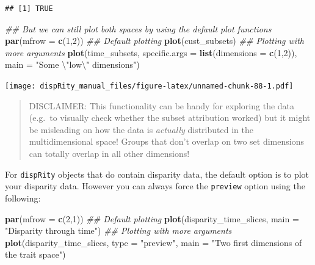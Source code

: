\documentclass[
]{book}
\newenvironment{Shaded}{\begin{snugshade}}{\end{snugshade}}
\newcommand{\CharTok}[1]{\textcolor[rgb]{0.31,0.60,0.02}{#1}}
\newcommand{\CommentTok}[1]{\textcolor[rgb]{0.56,0.35,0.01}{\textit{#1}}}
\newcommand{\DataTypeTok}[1]{\textcolor[rgb]{0.13,0.29,0.53}{#1}}
\newcommand{\DecValTok}[1]{\textcolor[rgb]{0.00,0.00,0.81}{#1}}
\newcommand{\KeywordTok}[1]{\textcolor[rgb]{0.13,0.29,0.53}{\textbf{#1}}}
\newcommand{\NormalTok}[1]{#1}
\newcommand{\StringTok}[1]{\textcolor[rgb]{0.31,0.60,0.02}{#1}}
\begin{document}
\begin{verbatim}
## [1] TRUE
\end{verbatim}

\begin{Shaded}
\begin{Highlighting}[]
\CommentTok{\#\# But we can still plot both spaces by using the default plot functions}
\KeywordTok{par}\NormalTok{(}\DataTypeTok{mfrow =} \KeywordTok{c}\NormalTok{(}\DecValTok{1}\NormalTok{,}\DecValTok{2}\NormalTok{))}
\CommentTok{\#\# Default plotting}
\KeywordTok{plot}\NormalTok{(cust\_subsets)}
\CommentTok{\#\# Plotting with more arguments}
\KeywordTok{plot}\NormalTok{(time\_subsets, }\DataTypeTok{specific.args =} \KeywordTok{list}\NormalTok{(}\DataTypeTok{dimensions =} \KeywordTok{c}\NormalTok{(}\DecValTok{1}\NormalTok{,}\DecValTok{2}\NormalTok{)),}
     \DataTypeTok{main =} \StringTok{"Some }\CharTok{\textbackslash{}"}\StringTok{low}\CharTok{\textbackslash{}"}\StringTok{ dimensions"}\NormalTok{)}
\end{Highlighting}
\end{Shaded}

\texttt{[image: dispRity\_manual\_files/figure-latex/unnamed-chunk-88-1.pdf]}

\begin{quote}
DISCLAIMER: This functionality can be handy for exploring the data (e.g.~to visually check whether the subset attribution worked) but it might be misleading on how the data is \emph{actually} distributed in the multidimensional space!
Groups that don't overlap on two set dimensions can totally overlap in all other dimensions!
\end{quote}

For \texttt{dispRity} objects that do contain disparity data, the default option is to plot your disparity data.
However you can always force the \texttt{preview} option using the following:

\begin{Shaded}
\begin{Highlighting}[]
\KeywordTok{par}\NormalTok{(}\DataTypeTok{mfrow =} \KeywordTok{c}\NormalTok{(}\DecValTok{2}\NormalTok{,}\DecValTok{1}\NormalTok{))}
\CommentTok{\#\# Default plotting}
\KeywordTok{plot}\NormalTok{(disparity\_time\_slices, }\DataTypeTok{main =} \StringTok{"Disparity through time"}\NormalTok{)}
\CommentTok{\#\# Plotting with more arguments}
\KeywordTok{plot}\NormalTok{(disparity\_time\_slices, }\DataTypeTok{type =} \StringTok{"preview"}\NormalTok{,}
     \DataTypeTok{main =} \StringTok{"Two first dimensions of the trait space"}\NormalTok{)}
\end{Highlighting}
\end{Shaded}
\end{document}
